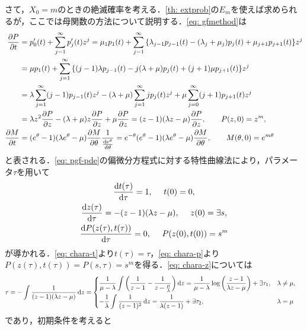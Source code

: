 \documentclass[dvipdfmx]{jsarticle}
\numberwithin{equation}{section}
\theoremstyle{definition}
\newcommand{\0}{\bm{0}}
\newcommand{\1}{\bm{1}}
\begin{document}
さて，$X_0 = m$のときの絶滅確率を考える．\cref{th: extprob}の$E_m$を使えば求められるが，ここでは母関数の方法について説明する．\eqref{eq: gfmethod}は
\begin{align}
  \pdv{P}{t} &= p_0'(t) + \sum_{j=1}^{\infty} p_j'(t) z^j
  = \mu_1 p_1(t) + \sum_{j=1}^{\infty} \qty{ \lambda_{j-1} p_{j-1}(t) -(\lambda_j + \mu_j) p_j(t) + \mu_{j+1} p_{j+1}(t) } z^j \\
  &= \mu p_1(t) + \sum_{j=1}^{\infty} \qty{ (j-1) \lambda p_{j-1}(t) - j (\lambda + \mu) p_j(t) + (j+1) \mu p_{j+1}(t) } z^j \\
  &= \lambda \sum_{j=1}^{\infty} (j-1) p_{j-1}(t) z^j -(\lambda + \mu) \sum_{j=1}^{\infty} j p_j(t) z^j + \mu \sum_{j=0}^{\infty} (j+1) p_{j+1}(t) z^j \\  
  &= \lambda z^2 \pdv{P}{z} -(\lambda + \mu) z \pdv{P}{z} + \mu \pdv{P}{z}
  = (z-1)(\lambda z - \mu) \pdv{P}{z}, ~~~~~~ P(z,0) = z^m, \label{eq: pgf-pde}\\
  \pdv{M}{t} &= (e^{\theta} - 1)(\lambda e^{\theta} - \mu) \pdv{M}{\theta} \frac{1}{\dv{e^{\theta}}{\theta}}
  = e^{-\theta} (e^{\theta} - 1)(\lambda e^{\theta} - \mu) \pdv{M}{\theta}, ~~~~~~ M(\theta, 0) = e^{m \theta} \label{eq: mgf-pde}
\end{align}
と表される．\eqref{eq: pgf-pde}の偏微分方程式に対する特性曲線法により，パラメータ$\tau$を用いて
\begin{gather}
  \dv{t(\tau)}{\tau} = 1, ~~~~ t(0) = 0, \label{eq: chara-t}\\
  \dv{z(\tau)}{\tau} = -(z-1)(\lambda z - \mu), ~~~~ z(0) = \exists s, \label{eq: chara-z}\\
  \dv{P(z(\tau), t(\tau))}{\tau} = 0, ~~~~ P(z(0),t(0)) = s^m \label{eq: chara-p}
\end{gather}
が導かれる．\eqref{eq: chara-t}より$t(\tau) = \tau$，\eqref{eq: chara-p}より$P(z(\tau), t(\tau)) = P(s, \tau) = s^m$を得る．\eqref{eq: chara-z}については
\begin{align}
  \tau &= -\int \frac{1}{(z-1)(\lambda z - \mu)} \dd{z} = \begin{dcases}
    \frac{1}{\mu - \lambda} \int \qty( \frac{1}{z-1} - \frac{1}{z - \frac{\mu}{\lambda}} ) \dd{z}
    = \frac{1}{\mu - \lambda} \log \qty( \frac{z-1}{\lambda z - \mu}) + \exists \tau_1, & \lambda \ne \mu, \\
    -\frac{1}{\lambda} \int \frac{1}{(z-1)^2} \dd{z}
    = \frac{1}{\lambda(z-1)} + \exists \tau_2, & \lambda = \mu
  \end{dcases}
\end{align}
であり，初期条件を考えると
\end{document}
